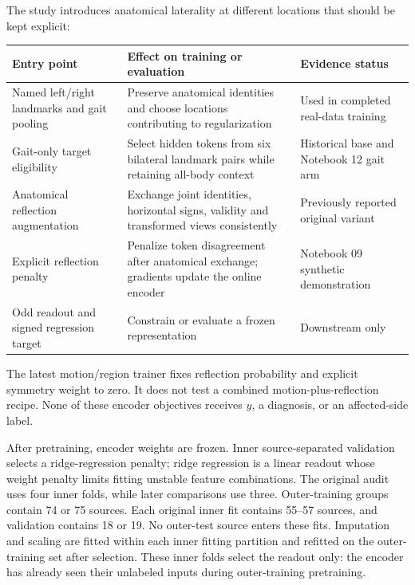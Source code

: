 \documentclass{article}
\begin{document}
The study introduces anatomical laterality at different locations that should be kept explicit:

\begin{table}[htbp]
\centering
\small
\begin{tabular}{@{}
  >{\raggedright\arraybackslash}p{}
  >{\raggedright\arraybackslash}p{}
  >{\raggedright\arraybackslash}p{}@{}}
\toprule\noalign{}
\begin{minipage}[b]{\linewidth}\raggedright
Entry point
\end{minipage} & \begin{minipage}[b]{\linewidth}\raggedright
Effect on training or evaluation
\end{minipage} & \begin{minipage}[b]{\linewidth}\raggedright
Evidence status
\end{minipage} \\
\midrule\noalign{}

Named left/right landmarks and gait pooling & Preserve anatomical identities and choose locations contributing to regularization & Used in completed real-data training \\
Gait-only target eligibility & Select hidden tokens from six bilateral landmark pairs while retaining all-body context & Historical base and Notebook 12 gait arm \\
Anatomical reflection augmentation & Exchange joint identities, horizontal signs, validity and transformed views consistently & Previously reported original variant \\
Explicit reflection penalty & Penalize token disagreement after anatomical exchange; gradients update the online encoder & Notebook 09 synthetic demonstration \\
Odd readout and signed regression target & Constrain or evaluate a frozen representation & Downstream only \\
\bottomrule
\end{tabular}
\end{table}

The latest motion/region trainer fixes reflection probability and explicit symmetry weight to zero. It does not test a combined motion-plus-reflection recipe. None of these encoder objectives receives \(y\), a diagnosis, or an affected-side label.

After pretraining, encoder weights are frozen. Inner source-separated validation selects a ridge-regression penalty; ridge regression is a linear readout whose weight penalty limits fitting unstable feature combinations. The original audit uses four inner folds, while later comparisons use three. Outer-training groups contain 74 or 75 sources. Each original inner fit contains 55--57 sources, and validation contains 18 or 19. No outer-test source enters these fits. Imputation and scaling are fitted within each inner fitting partition and refitted on the outer-training set after selection. These inner folds select the readout only: the encoder has already seen their unlabeled inputs during outer-training pretraining.
\end{document}

